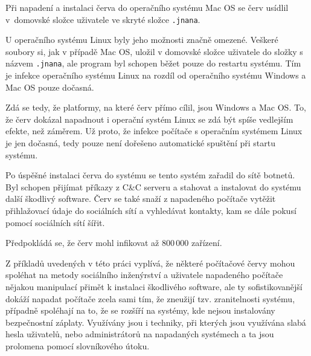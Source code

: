 \documentclass[a4paper,12pt]{article}
\begin{document}
Při napadení a instalaci červa do operačního systému Mac OS se červ usídlil v~domovské složce uživatele ve skryté složce \texttt{.jnana}.

U operačního systému Linux byly jeho možnosti značně omezené. Veškeré soubory si, jak v případě Mac OS, uložil v domovské složce uživatele do složky s názvem \texttt{.jnana}, ale program byl schopen běžet pouze do restartu systému. Tím je infekce operačního systému Linux na rozdíl od operačního systému Windows a Mac OS pouze dočasná.\cite{koobface-linux}\cite{koobface-softpedia}

Zdá se tedy, že platformy, na které červ přímo cílil, jsou Windows a Mac OS. To, že červ dokázal napadnout i operační systém Linux se zdá být spíše vedlejším efekte, než záměrem. Už proto, že infekce počítače s operačním systémem Linux je jen dočasná, tedy pouze není dořešeno automatické spuštění při startu systému.\cite{koobface-softpedia2}

Po úspěšné instalaci červa do systému se tento systém zařadil do sítě botnetů. Byl schopen přijímat příkazy z C\&C serveru a stahovat a instalovat do systému další škodlivý software. Červ se také snaží z napadeného počítače vytěžit přihlažovací údaje do sociálních sítí a vyhledávat kontakty, kam se dále pokusí pomocí sociálních sítí šířit.\cite{koobface-fsecure}

Předpokládá se, že červ mohl infikovat až 800\,000 zařízení.\cite{koobface-bbc}

Z příkladů uvedených v této práci vyplívá, že některé počítačové červy mohou spoléhat na metody sociálního inženýrství a uživatele napadeného počítače nějakou manipulací přimět k instalaci škodlivého software, ale ty sofistikovanější dokáží napadat počítače zcela sami tím, že zneužijí tzv.  zranitelnosti systému, případně spoléhají na to, že se rozšíří na systémy, kde nejsou instalovány bezpečnostní záplaty. Využívány jsou i techniky, při kterých jsou využívána slabá hesla uživatelů, nebo administrátorů na napadaných systémech a ta jsou prolomena pomocí slovníkového útoku.
\end{document}
